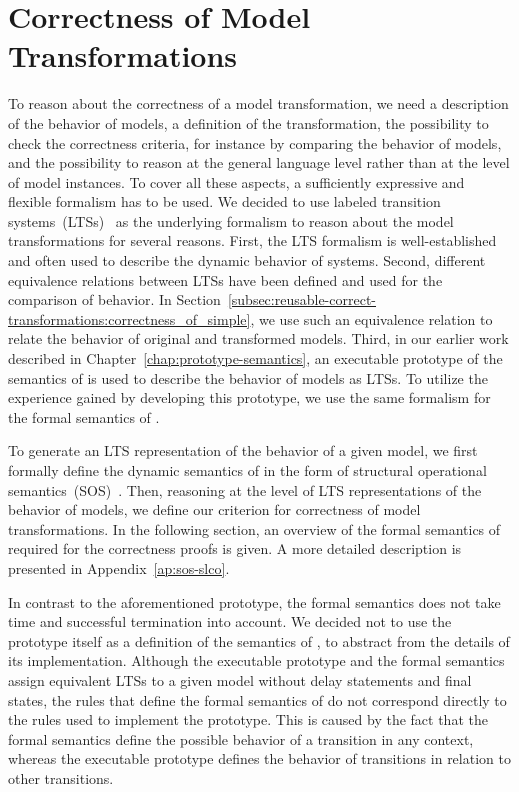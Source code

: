 \section{Correctness of Model Transformations}
\label{sec:reusable-correct-transformations:correctness_of_transformations}
To reason about the correctness of a model transformation, we need a description of the behavior of models, a definition of the transformation, the possibility to check the correctness criteria, for instance by comparing the behavior of models, and the possibility to reason at the general language level rather than at the level of model instances.
To cover all these aspects, a sufficiently expressive and flexible formalism has to be used.
We decided to use labeled transition systems~(LTSs)~\cite{SOS2004Plotkin} as the underlying formalism to reason about the \SLCO model transformations for several reasons.
First, the LTS formalism is well-established and often used to describe the dynamic behavior of systems.
Second, different equivalence relations between LTSs have been defined and used for the comparison of behavior.
In Section~\ref{subsec:reusable-correct-transformations:correctness_of_simple}, we use such an equivalence relation to relate the behavior of original and transformed models.
Third, in our earlier work described in Chapter~\ref{chap:prototype-semantics}, an executable prototype of the semantics of \SLCO is used to describe the behavior of models as LTSs.
To utilize the experience gained by developing this prototype, we use the same formalism for the formal semantics of \SLCO.

To generate an LTS representation of the behavior of a given model, we first formally define the dynamic semantics of \SLCO in the form of structural operational semantics~(SOS)~\cite{SOS2004Plotkin}.
Then, reasoning at the level of LTS representations of the behavior of models, we define our criterion for correctness of model transformations.
In the following section, an overview of the formal semantics of \SLCO required for the correctness proofs is given.
A more detailed description is presented in Appendix~\ref{ap:sos-slco}.

In contrast to the aforementioned prototype, the formal semantics does not take time and successful termination into account.
We decided not to use the prototype itself as a definition of the semantics of \SLCO, to abstract from the details of its implementation.
Although the executable prototype and the formal semantics assign equivalent LTSs to a given \SLCO model without delay statements and final states, the rules that define the formal semantics of \SLCO do not correspond directly to the rules used to implement the prototype.
This is caused by the fact that the formal semantics define the possible behavior of a transition in any context, whereas the executable prototype defines the behavior of transitions in relation to other transitions.

